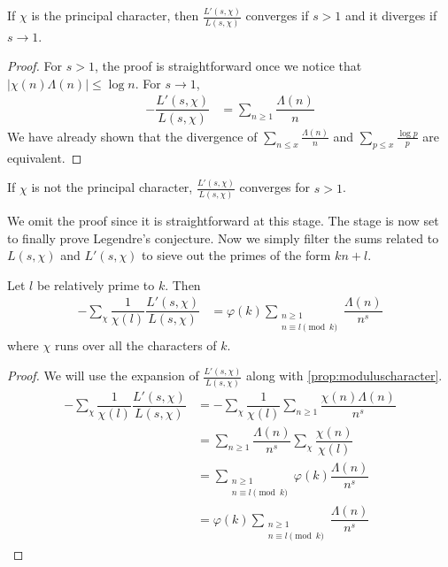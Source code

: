 \documentclass[elemannt.tex]{subfile}
\begin{document}
		\begin{proposition}
			If $\chi$ is the principal character, then $\frac{L'(s, \chi)}{L(s, \chi)}$ converges if $s>1$ and it diverges if $s\to1$.
		\end{proposition}

		\begin{proof}
			For $s>1$, the proof is straightforward once we notice that $|\chi(n)\Lambda(n)|\leq\log{n}$. For $s\to1$,
				\begin{align*}
					-\dfrac{L'(s, \chi)}{L(s, \chi)}
						& = \sum_{n\geq1}\dfrac{\Lambda(n)}{n}
				\end{align*}
			We have already shown that the divergence of $\sum_{n\leq x}\frac{\Lambda(n)}{n}$ and $\sum_{p\leq x}\frac{\log{p}}{p}$ are equivalent.
		\end{proof}

		\begin{proposition}
			If $\chi$ is not the principal character, $\frac{L'(s, \chi)}{L(s, \chi)}$ converges for $s>1$.
		\end{proposition}
	We omit the proof since it is straightforward at this stage. The stage is now set to finally prove Legendre's conjecture. Now we simply filter the sums related to $L(s, \chi)$ and $L'(s, \chi)$ to sieve out the primes of the form $kn+l$.
		\begin{proposition}\label{prop:filtermodulus}
			Let $l$ be relatively prime to $k$. Then
				\begin{align*}
					-\sum_{\chi}\dfrac{1}{\chi(l)}\dfrac{L'(s, \chi)}{L(s, \chi)}
						& = \varphi(k)\sum_{\substack{n\geq1\\n\equiv l\pmod{k}}}\dfrac{\Lambda(n)}{n^{s}}
				\end{align*}
			where $\chi$ runs over all the characters of $k$.
		\end{proposition}

		\begin{proof}
			We will use the expansion of $\frac{L'(s, \chi)}{L(s, \chi)}$ along with \autoref{prop:moduluscharacter}.
				\begin{align*}
					-\sum_{\chi}\dfrac{1}{\chi(l)}\dfrac{L'(s, \chi)}{L(s, \chi)}
						& = -\sum_{\chi}\dfrac{1}{\chi(l)}\sum_{n\geq1}\dfrac{\chi(n)\Lambda(n)}{n^{s}}\\
						& = \sum_{n\geq1}\dfrac{\Lambda(n)}{n^{s}}\sum_{\chi}\dfrac{\chi(n)}{\chi(l)}\\
						& = \sum_{\substack{n\geq1\\n\equiv l\pmod{k}}}\varphi(k)\dfrac{\Lambda(n)}{n^{s}}\\
						& = \varphi(k)\sum_{\substack{n\geq1\\n\equiv l\pmod{k}}}\dfrac{\Lambda(n)}{n^{s}}
				\end{align*}
		\end{proof}
\end{document}
